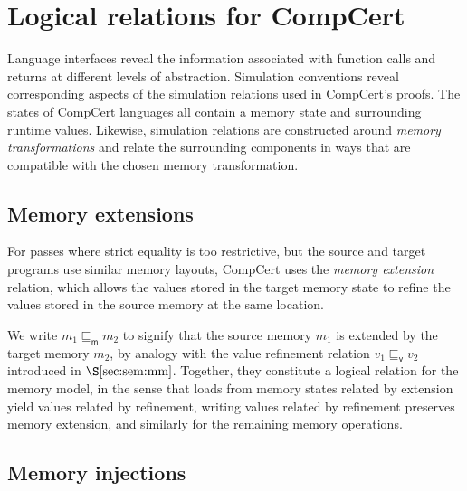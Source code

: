 \documentclass[sigplan,10pt,review,anonymous]{acmart}
\newcommand{\kw}[1]{\ensuremath{ \mathsf{#1} }}
\newcommand{\vref}{\sqsubseteq_\kw{v}}
\newcommand{\mext}{\sqsubseteq_\kw{m}}
\begin{document}

\section{Logical relations for CompCert} \label{sec:cklr} %

Language interfaces reveal the information
associated with function calls and returns
at different levels of abstraction.
Simulation conventions
reveal corresponding aspects of the simulation relations
used in CompCert's proofs.
%
The states of CompCert languages all contain
a memory state and surrounding runtime values.
Likewise, simulation relations
are constructed around \emph{memory transformations}
and relate the surrounding components in ways that %
are compatible with the chosen memory transformation.

\subsection{Memory extensions} \label{sec:memext} %

For passes where strict equality is too restrictive,
but the source and target programs
use similar memory layouts,
CompCert uses the \emph{memory extension} relation,
which allows the values
stored in the target memory state to refine
the values stored in the source memory at the same location.

We write $m_1 \mext m_2$ to signify that
the source memory $m_1$ is extended by
the target memory $m_2$,
by analogy with
the value refinement relation $v_1 \vref v_2$
introduced in $\S\ref{sec:sem:mm}$.
Together,
they
constitute a logical relation for the memory model,
in the sense that
loads from memory states related by extension
yield values related by refinement,
writing values related by refinement
preserves memory extension,
and similarly for the remaining memory operations.


\subsection{Memory injections} \label{sec:meminj} %
\end{document}
